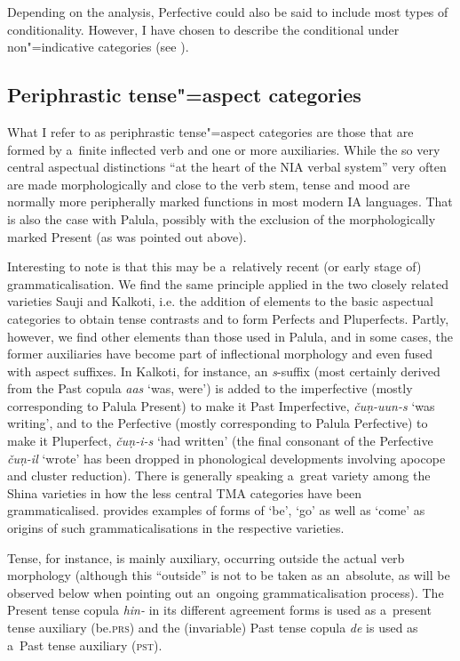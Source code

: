 Depending on the analysis, Perfective could also be said to include most types of conditionality. However, I have chosen to describe the conditional under non"=indicative categories (see ).


\subsection{Periphrastic tense"=aspect categories}
\label{subsec:9-1-5}

What I refer to as periphrastic tense"=aspect categories are those that are formed by a~finite inflected verb and one or more auxiliaries. While the so very central aspectual distinctions ``at the heart of the NIA verbal system'' \citep[262]{masica1991} very often are made morphologically and close to the verb stem, tense and mood are normally more peripherally marked functions in most modern IA languages. That is also the case with Palula, possibly with the exclusion of the morphologically marked Present (as was pointed out above). 



Interesting to note is that this may be a~relatively recent (or early stage of) grammaticalisation. We find the same principle applied in the two closely related varieties Sauji and Kalkoti, i.e. the addition of elements to the basic aspectual categories to obtain tense contrasts and to form Perfects and Pluperfects. Partly, however, we find other elements than those used in Palula, and in some cases, the former auxiliaries have become part of inflectional morphology and even fused with aspect suffixes. In Kalkoti, for instance, an \textit{s}-suffix (most certainly derived from the Past copula \textit{aas} `was, were') is added to the imperfective (mostly corresponding to Palula Present) to make it Past Imperfective, \textit{čuṇ-uun-s} `was writing', and to the Perfective (mostly corresponding to Palula Perfective) to make it Pluperfect, \textit{čuṇ-i-s} `had written' (the final consonant of the Perfective \textit{čuṇ-il} `wrote' has been dropped in phonological developments involving apocope and cluster reduction). There is generally speaking a~great variety among the Shina varieties in how the less central TMA categories have been grammaticalised. \citet[38]{schmidt2002} provides examples of forms of `be', `go' as well as `come' as origins of such grammaticalisations in the respective varieties. 



Tense, for instance, is mainly auxiliary, occurring outside the actual verb morphology (although this ``outside'' is not to be taken as an~absolute, as will be observed below when pointing out an~ongoing grammaticalisation process). The Present tense copula \textit{hin-} in its different agreement forms is used as a~present tense auxiliary (be.\textsc{prs}) and the (invariable) Past tense copula \textit{de} is used as a~Past tense auxiliary (\textsc{pst}).



